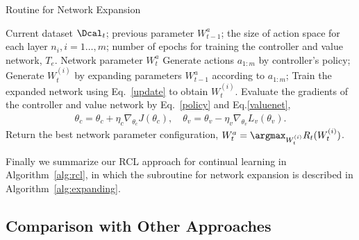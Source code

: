 \documentclass{article}
\begin{document}
\begin{algorithm}[tb]
  \caption{Routine for Network Expansion}
  \label{alg:expanding}
  \begin{algorithmic}[1]
     Current dataset $\Dcal_t$; previous parameter $W_{t-1}^a$; the size of action space for each layer $n_i, i=1\dots,m$; number of epochs for training the controller and value network, $T_e$.
     Network parameter $W_t^a$
    \STATE Generate actions $a_{1:m}$ by controller's policy;
    \STATE Generate $W_t^{(i)}$ by expanding parameters $W_{t-1}^a$ according to $a_{1:m}$;
    \STATE Train the expanded network using Eq.~\eqref{update} to obtain $W_t^{(i)}$.
    \STATE Evaluate the gradients of the controller and value network by Eq.~\eqref{policy} and Eq.\eqref{valuenet},
    \begin{align}
    \theta_c = \theta_c + \eta_c \nabla_{\theta_c}J(\theta_c), \quad
    \theta_v = \theta_v - \eta_v \nabla_{\theta_v}L_v(\theta_v). \nonumber
    \end{align}
    \ENDFOR
    \STATE Return the best network parameter configuration, $W_t^a = \argmax_{W_t^{(i)}} R_t(W_t^{(i)})$.
  \end{algorithmic}
\end{algorithm}

Finally we summarize our RCL approach for continual learning in Algorithm~\ref{alg:rcl}, in which the subroutine for network expansion is described in Algorithm~\ref{alg:expanding}.

\subsection{Comparison with Other Approaches}
\end{document}

